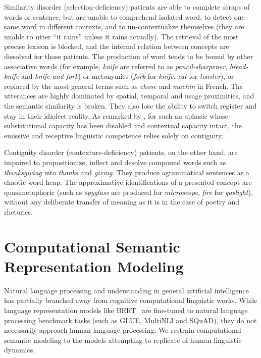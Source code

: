 Similarity disorder (selection-deficiency) patients are able to complete scraps of words or sentence, but are unable to comprehend isolated word, to detect one same word in different contexts, and to un-contextualize themselves (they are unable to utter ``it rains'' unless it rains actually). The retrieval of the most precise lexicon is blocked, and the internal relation between concepts are dissolved for those patients. The production of word tends to be bound by other associative words (for example, \emph{knife} are referred to as \emph{pencil-sharpener}, \emph{bread-knife} and \emph{knife-and-fork}) or metonymies (\emph{fork} for \emph{knife}, \emph{eat} for \emph{toaster}), or replaced by the most general terms such as \emph{chose} and \emph{machin} in French. The utterances are highly dominated by spatial, temporal and usage proximities, and the semantic similarity is broken. They also lose the ability to switch register and stay in their idiolect reality. As remarked by \citeauthor{jakobsonFundamentalsLanguage1963}, for such an aphasic whose substitutional capacity has been disabled and contextual capacity intact, the emissive and receptive linguistic competence relies solely on contiguity. 

Contiguity disorder (contexture-deficiency) patients, on the other hand, are impaired to propositionize, inflect and desolve compound words such as \emph{thanksgiving} into \emph{thanks} and \emph{giving}. They produce agrammatical sentences as a chaotic word heap. The approximative identifications of a presented concept are quasimetaphoric (such as \emph{spyglass} are produced for \emph{microscope}, \emph{fire} for \emph{gaslight}), without any deliberate transfer of meaning as it is in the case of poetry and rhetorics. 


\section{Computational Semantic Representation Modeling}

Natural language processing and understanding in general artificial intelligence has partially branched away from cognitive computational linguistic works. While language representation models like BERT~\parencite{devlinBERTPretrainingDeep2018} are fine-tuned to natural language processing benchmark tasks (such as GLUE, MultiNLI and SQuAD), they do not necessarily approach human language processing. We restrain computational semantic modeling to the models attempting to replicate of human linguistic dynamics. 

